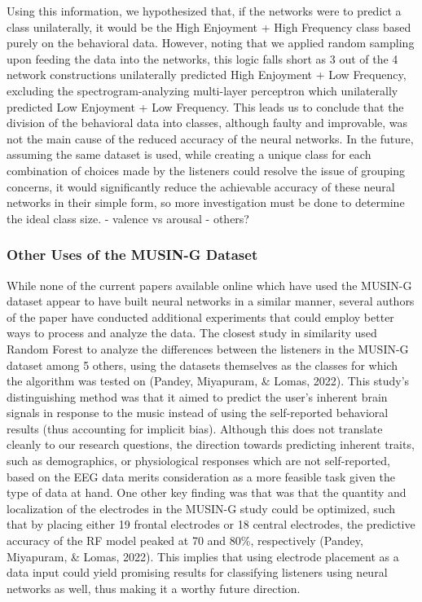 \documentclass[fleqn,10pt]{SelfArx} %
\begin{document}
Using this information, we hypothesized that, if the networks were to predict a class unilaterally, it would be the High Enjoyment + High Frequency  class based purely on the behavioral data. However, noting that we applied random sampling upon feeding the data into the networks, this logic falls short as 3 out of the 4 network constructions unilaterally predicted High Enjoyment + Low Frequency, excluding the spectrogram-analyzing multi-layer perceptron which unilaterally predicted Low Enjoyment + Low Frequency. This leads us to conclude that the division of the behavioral data into classes, although faulty and improvable, was not the main cause of the reduced accuracy of the neural networks. In the future, assuming the same dataset is used, while creating a unique class for each combination of choices made by the listeners could resolve the issue of grouping concerns, it would significantly reduce the achievable accuracy of these neural networks in their simple form, so more investigation must be done to determine the ideal class size. 
- valence vs arousal
- others?

\subsubsection{Other Uses of the MUSIN-G Dataset}

While none of the current papers available online which have used the MUSIN-G dataset appear to have built neural networks in a similar manner, several authors of the paper have conducted additional experiments that could employ better ways to process and analyze the data. The closest study in similarity used Random Forest to analyze the differences between the listeners in the MUSIN-G dataset among 5 others, using the datasets themselves as the classes for which the algorithm was tested on (Pandey, Miyapuram, \& Lomas, 2022). This study's distinguishing method was that it aimed to predict the user's inherent brain signals in response to the music instead of using the self-reported behavioral results (thus accounting for implicit bias). Although this does not translate cleanly to our research questions, the direction towards predicting inherent traits, such as demographics, or physiological responses which are not self-reported, based on the EEG data merits consideration as a more feasible task given the type of data at hand. 
    One other key finding was that was that the quantity and localization of the electrodes in the MUSIN-G study could be optimized, such that by placing either 19 frontal electrodes or 18 central electrodes, the predictive accuracy of the RF model peaked at 70 and 80\%, respectively (Pandey, Miyapuram, \& Lomas, 2022). This implies that using electrode placement as a data input could yield promising results for classifying listeners using neural networks as well, thus making it a worthy future direction.
\end{document}
